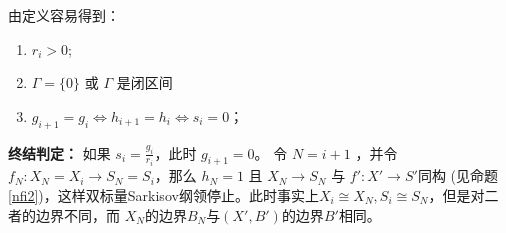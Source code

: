 \begin{remark}
由定义容易得到：  
\begin{enumerate}
  \item $r_{i}>0$;
  \item  $\Gamma=\{0\} $ 或 $\Gamma$ 是闭区间
  \item $g_{i+1}=g_{i} \Leftrightarrow h_{i+1}=h_{i} \Leftrightarrow s_{i}=0$；
\end{enumerate}
\end{remark}

\textbf{终结判定：}
如果 $s_{i}=\frac{g_{i}}{r_{i}}$，此时 $g_{i+1}=0$。 令 $N=i+1$ ，并令$f_{N}:X_{N}=X_{i} \to S_{N}=S_{i}$，那么 $h_{N}=1$ 且 $X_{N}\to S_{N}$ 与 $f':X'\to S'$同构 (见命题 \ref{nfi2})，这样双标量Sarkisov纲领停止。此时事实上$X_{i}\cong X_{N},S_{i}\cong S_{N}$，但是对二者的边界不同，而 $X_{N}$的边界$B_{N}$与$(X',B')$的边界$B'$相同。

